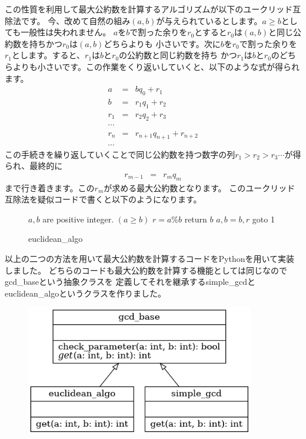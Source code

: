 \documentclass[dvipdfmx]{jarticle}
\begin{document}
\begin{itemize}
この性質を利用して最大公約数を計算するアルゴリズムが以下のユークリッド互除法です。
今、改めて自然の組み$(a,b)$が与えられているとします。$a\geq b$としても一般性は失われません。
$a$を$b$で割った余りを$r_0$とすると$r_0$は$(a,b)$と同じ公約数を持ちかつ$r_0$は$(a,b)$どちらよりも
小さいです。次に$b$を$r_0$で割った余りを$r_1$とします。すると、$r_1$は$b$と$r_0$の公約数と同じ約数を持ち
かつ$r_1$は$b$と$r_0$のどちらよりも小さいです。この作業をくり返いしていくと、以下のような式が得られます。
\begin{eqnarray}
a&=&bq_{0}+r_{1}\\
b&=&r_{1}q_{1}+r_{2}\\
r_1&=&r_{2}q_{2}+r_{3}\\
\cdots\\
r_n&=&r_{n+1}q_{n+1}+r_{n+2}\\
\cdots
\end{eqnarray}
この手続きを繰り返していくことで同じ公約数を持つ数字の列$r_{1}>r_{2}>r_{3}\cdots$が得られ、最終的に
\begin{eqnarray}
r_{m-1}&=&r_{m}q_{m}
\end{eqnarray}
まで行き着きます。この$r_{m}$が求める最大公約数となります。
このユークリッド互除法を疑似コードで書くと以下のようになります。
\begin{figure}[H]
\begin{algorithm}[H]
	\caption{euclidean\_algo}
	\label{alg2}
	\begin{algorithmic}[1]  
	\REQUIRE $a,b$ are positive integer. $(a\geq b)$
    	\STATE $r = a\%b$
    	\STATE return $b$
	\ENDIF
    	\STATE $a,b = b,r$
	\STATE goto 1
	\end{algorithmic}
\end{algorithm}
\end{figure}
 \end{itemize}
 以上の二つの方法を用いて最大公約数を計算するコードをPythonを用いて実装しました。
 どちらのコードも最大公約数を計算する機能としては同じなのでgcd\_baseという抽象クラスを
 定義してそれを継承するsimple\_gcdとeuclidean\_algoというクラスを作りました。
  \begin{figure}[h]
 \begin{center}
\includegraphics[width=100mm]{classes.png}
\end{center}
\end{figure}
\end{document}
